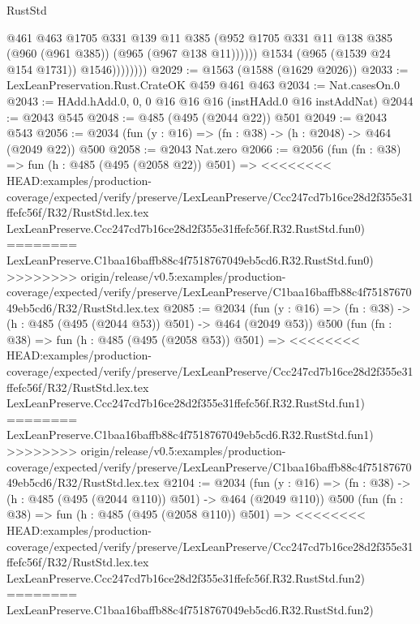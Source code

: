 \begin{lexlean}{RustStd}
\begin{coremodule}
{\begin{coremodule}
{{{{{{{                          @461
                          @463
                          @1705
                          @331
                          @139
                          @11
                          @385
                          (@952
                            @1705
                            @331
                            @11
                            @138
                            @385
                            (@960 (@961 @385))
                            (@965 (@967 @138 @11))))))
                    @1534
                    (@965 (@1539 @24 @154 @1731))
                    @1546))))))))
@2029 := @1563 (@1588 (@1629 @2026))
@2033 := LexLeanPreservation.Rust.CrateOK @459 @461 @463
@2034 := Nat.casesOn.{0}
@2043 := HAdd.hAdd.{0, 0, 0} @16 @16 @16 (instHAdd.{0} @16 instAddNat)
@2044 := @2043 @545
@2048 := @485 (@495 (@2044 @22)) @501
@2049 := @2043 @543
@2056 := @2034 (fun (y : @16) => (fn : @38) -> (h : @2048) -> @464 (@2049 @22)) @500
@2058 := @2043 Nat.zero
@2066 := @2056
    (fun (fn : @38) =>
    fun (h : @485 (@495 (@2058 @22)) @501) =>
<<<<<<<< HEAD:examples/production-coverage/expected/verify/preserve/LexLeanPreserve/Ccc247cd7b16ce28d2f355e31ffefc56f/R32/RustStd.lex.tex
    LexLeanPreserve.Ccc247cd7b16ce28d2f355e31ffefc56f.R32.RustStd.fun0)
========
    LexLeanPreserve.C1baa16baffb88c4f7518767049eb5cd6.R32.RustStd.fun0)
>>>>>>>> origin/release/v0.5:examples/production-coverage/expected/verify/preserve/LexLeanPreserve/C1baa16baffb88c4f7518767049eb5cd6/R32/RustStd.lex.tex
@2085 := @2034
    (fun (y : @16) => (fn : @38) -> (h : @485 (@495 (@2044 @53)) @501) -> @464 (@2049 @53))
    @500
    (fun (fn : @38) =>
    fun (h : @485 (@495 (@2058 @53)) @501) =>
<<<<<<<< HEAD:examples/production-coverage/expected/verify/preserve/LexLeanPreserve/Ccc247cd7b16ce28d2f355e31ffefc56f/R32/RustStd.lex.tex
    LexLeanPreserve.Ccc247cd7b16ce28d2f355e31ffefc56f.R32.RustStd.fun1)
========
    LexLeanPreserve.C1baa16baffb88c4f7518767049eb5cd6.R32.RustStd.fun1)
>>>>>>>> origin/release/v0.5:examples/production-coverage/expected/verify/preserve/LexLeanPreserve/C1baa16baffb88c4f7518767049eb5cd6/R32/RustStd.lex.tex
@2104 := @2034
    (fun (y : @16) => (fn : @38) -> (h : @485 (@495 (@2044 @110)) @501) -> @464 (@2049 @110))
    @500
    (fun (fn : @38) =>
    fun (h : @485 (@495 (@2058 @110)) @501) =>
<<<<<<<< HEAD:examples/production-coverage/expected/verify/preserve/LexLeanPreserve/Ccc247cd7b16ce28d2f355e31ffefc56f/R32/RustStd.lex.tex
    LexLeanPreserve.Ccc247cd7b16ce28d2f355e31ffefc56f.R32.RustStd.fun2)
========
    LexLeanPreserve.C1baa16baffb88c4f7518767049eb5cd6.R32.RustStd.fun2)
}}}}}}}
\end{coremodule}}
\end{coremodule}
\end{lexlean}
